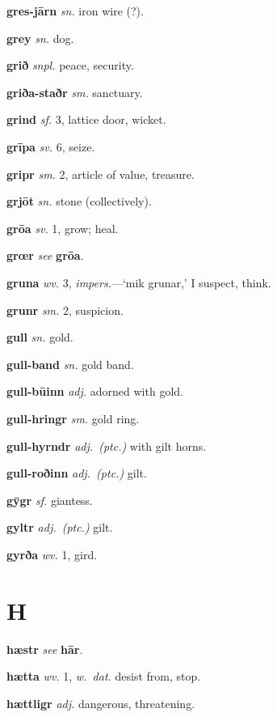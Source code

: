 \documentclass[12pt,letterpaper]{book}
\newcommand\emptypage{\clearpage{\pagestyle{empty}\cleardoublepage}}
\begin{document}
\noindent
\textbf{gres-jārn} \textit{sn.} iron wire (?).

\noindent
\textbf{grey} \textit{sn.} dog.

\noindent
\textbf{grið} \textit{snpl.} peace, security.

\noindent
\textbf{griða-staðr} \textit{sm.} sanctuary.

\noindent
\textbf{grind} \textit{sf.} 3, lattice door, wicket.

\noindent
\textbf{grīpa} \textit{sv.} 6, seize.

\noindent
\textbf{gripr} \textit{sm.} 2, article of value, treasure.

\noindent
\textbf{grjōt} \textit{sn.} stone (collectively).

\noindent
\textbf{grōa} \textit{sv.} 1, grow; heal.

\noindent
\textbf{grœr} \textit{} \textit{see} \textbf{grōa}.

\noindent
\textbf{gruna} \textit{wv.} 3, \textit{impers.}---`mik grunar,' I
	suspect, think.

\noindent
\textbf{grunr} \textit{sm.} 2, suspicion.

\noindent
\textbf{gull} \textit{sn.} gold.

\noindent
\textbf{gull-band} \textit{sn.} gold band.

\noindent
\textbf{gull-būinn} \textit{adj.} adorned with gold.

\noindent
\textbf{gull-hringr} \textit{sm.} gold ring.

\noindent
\textbf{gull-hyrndr} \textit{adj.\ (ptc.)} with gilt horns.

\noindent
\textbf{gull-roðinn} \textit{adj.\ (ptc.)} gilt.

\noindent
\textbf{gȳgr} \textit{sf.} giantess.

\noindent
\textbf{gyltr} \textit{adj.\ (ptc.)} gilt.

\noindent
\textbf{gyrða} \textit{wv.} 1, gird.

\emptypage

\chapter*{H}

\noindent
\textbf{hæstr} \textit{} \textit{see} \textbf{hār}.

\noindent
\textbf{hætta} \textit{wv.} 1, \textit{w.\ dat.} desist from, stop.

\noindent
\textbf{hættligr} \textit{adj.} dangerous, threatening.
\end{document}
